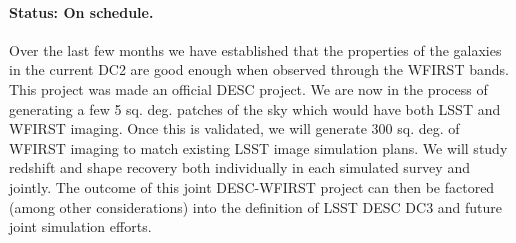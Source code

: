 \paragraph*{Status: On schedule.} Over the last few months we have established that the properties of the galaxies in the current DC2 are good enough when observed through the WFIRST bands. This project was made an official DESC project. We are now in the process of generating a few 5 sq. deg. patches of the sky which would have both LSST and WFIRST imaging. Once this is validated, we will generate 300 sq. deg. of WFIRST imaging to match existing LSST image simulation plans. We will study redshift and shape recovery both individually in each simulated survey and jointly. The outcome of this joint DESC-WFIRST project can then be factored (among other considerations) into the definition of LSST DESC DC3 and future joint simulation efforts. 

